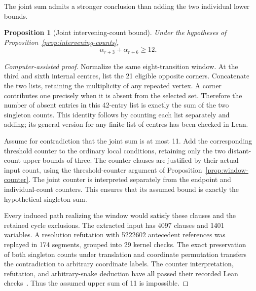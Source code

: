 \documentclass[11pt,a4paper]{article}
\newtheorem{proposition}[theorem]{Proposition}
\theoremstyle{definition}
\theoremstyle{remark}
\begin{document}
The joint sum admits a stronger conclusion than adding the two individual lower bounds.

\begin{proposition}[Joint intervening-count bound]\label{prop:joint-intervening}
Under the hypotheses of Proposition~\ref{prop:intervening-counts},
\[
\alpha_{r+3}+\alpha_{r+6}\ge12.
\]
\end{proposition}
\begin{proof}[Computer-assisted proof]
Normalize the same eight-transition window. At the third and sixth internal centres, list the 21 eligible opposite corners. Concatenate the two lists, retaining the multiplicity of any repeated vertex. A corner contributes one precisely when it is absent from the selected set. Therefore the number of absent entries in this 42-entry list is exactly the sum of the two singleton counts. This identity follows by counting each list separately and adding; its general version for any finite list of centres has been checked in Lean.

Assume for contradiction that the joint sum is at most 11. Add the corresponding threshold counter to the ordinary local conditions, retaining only the two distant-count upper bounds of three. The counter clauses are justified by their actual input count, using the threshold-counter argument of Proposition~\ref{prop:window-counter}. The joint counter is interpreted separately from the endpoint and individual-count counters. This ensures that its assumed bound is exactly the hypothetical singleton sum.

Every induced path realizing the window would satisfy these clauses and the retained cycle exclusions. The extracted input has 4097 clauses and 1401 variables. A resolution refutation with 5222602 antecedent references was replayed in 174 segments, grouped into 29 kernel checks. The exact preservation of both singleton counts under translation and coordinate permutation transfers the contradiction to arbitrary coordinate labels. The counter interpretation, refutation, and arbitrary-snake deduction have all passed their recorded Lean checks~\cite{jointinterveningarchive}. Thus the assumed upper sum of 11 is impossible.
\end{proof}
\end{document}
